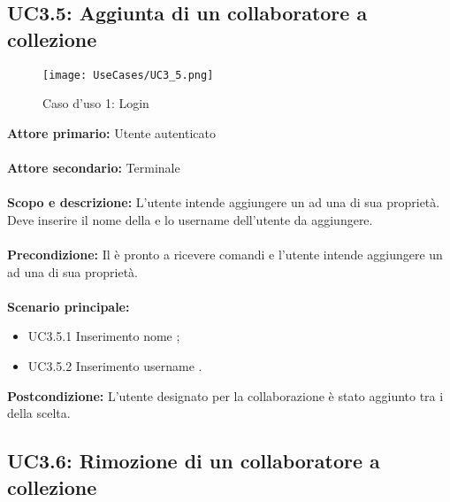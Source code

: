 \documentclass{scalatekids-article}
\begin{document}
\subsection{UC3.5: Aggiunta di un collaboratore a collezione}

\begin{figure}[H]
  \begin{center}
    \texttt{[image: UseCases/UC3\_5.png]}
    \caption*{Caso d'uso 1: Login}
  \end{center}
\end{figure}
\textbf{Attore primario:} Utente autenticato\\ \\
\textbf{Attore secondario:} Terminale\\ \\
\textbf{Scopo e descrizione:} L'utente intende aggiungere un  ad una  di sua proprietà. Deve inserire il nome della  e lo username dell'utente da aggiungere.\\ \\
\textbf{Precondizione:} Il  è pronto a ricevere comandi e l'utente intende aggiungere un  ad una  di sua proprietà.\\ \\
\textbf{Scenario principale:}
\begin{itemize}
\item UC3.5.1 Inserimento nome ;
\item UC3.5.2 Inserimento username .
\end{itemize}
\textbf{Postcondizione:} L'utente designato per la collaborazione è stato aggiunto tra i  della  scelta.

\subsection{UC3.6: Rimozione di un collaboratore a collezione}
\end{document}
